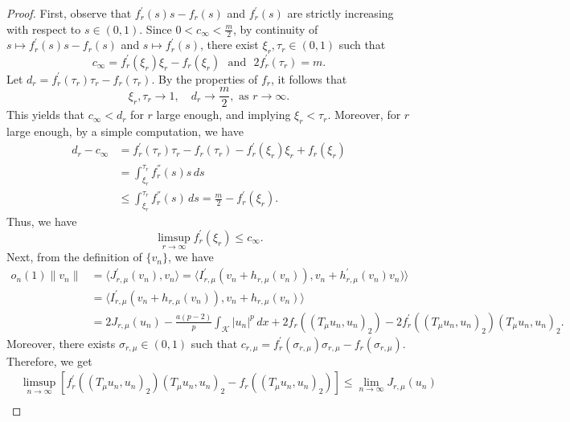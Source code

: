 \documentclass[11pt]{amsart}
\newcommand{\abs}[1]{\lvert#1\rvert}
\newcommand{\norm}[1]{\lVert#1\rVert}
\newcommand{\K}{\mathcal{K}}
\numberwithin{equation}{section}
\begin{document}
\begin{proof}
 First, observe that $f_{r}^{\prime}(s)s-f_{r}(s)$ and $f_{r}^{\prime}(s)$ are strictly increasing with respect to $s \in (0,1)$. Since $0<c_\infty < \frac{m}{2}$, by continuity of $s \mapsto f_{r}^{\prime}(s) s-f_{r}(s)$ and $s \mapsto f_{r}^{\prime}(s)$, there exist $\xi_{r}, \tau_{r} \in (0,1)$ such that
$$
c_{\infty}=f_{r}^{\prime}(\xi_{r})\xi_{r}-f_{r}(\xi_{r})\,\, \text{ and }\,\, 2f_{r}^{\prime}(\tau_{r})=m.
$$
Let $d_{r}=f_{r}^{\prime}(\tau_{r}) \tau_{r}-f_{r}(\tau_{r})$. By the properties of $f_{r}$, it follows that
$$
\xi_{r}, \tau_{r} \to 1, \quad d_{r} \to \frac{m}{2},\,\,\text{as}\,\,r \to \infty.
$$
This yields that $c_{\infty}<d_{r}$ for $r$ large enough, and implying $\xi_{r}<\tau_{r}$. Moreover, for $r$ large enough, by a simple computation, we have
$$
\begin{aligned}
d_{r}-c_{\infty} & =f_{r}^{\prime}(\tau_{r}) \tau_{r}-f_{r}(\tau_{r})-f_{r}^{\prime}(\xi_{r}) \xi_{r}+f_{r}(\xi_{r}) \\
& =\int_{\xi_{r}}^{\tau_{r}} f_{r}^{''}(s) s \,ds \\
& \leq \int_{\xi_{r}}^{\tau_{r}} f_{r}^{''}(s) \,ds=\frac{m}{2}-f_{r}^{\prime}(\xi_{r}).
\end{aligned}
$$
Thus, we have
\begin{equation}\label{eqsupfr}
\limsup_{r \to \infty} f_{r}^{\prime}(\xi_{r}) \leq c_{\infty}.
\end{equation}
Next, from the definition of $\{v_{n}\}$, we have
$$
\begin{aligned}
 o_{n}(1)\norm{v_{n}} &= \langle J_{r, \mu}^{\prime}(v_{n}), v_{n}\rangle=\langle I_{r, \mu}^{\prime}(v_{n}+h_{r, \mu}(v_{n})),v_{n}+h_{r, \mu}^{\prime}(v_{n}) v_{n})\rangle \\
& =\langle I_{r, \mu}^{\prime}(v_{n}+h_{r, \mu}(v_{n})),v_{n}+h_{r, \mu}(v_{n})\rangle \\
& =2 J_{r, \mu}(u_{n})-\frac{a(p-2)}{p} \int_{\K}\abs{u_{n}}^{p}\,dx+2 f_{r}((T_{\mu} u_{n}, u_{n})_{2})-2f_{r}^{\prime}((T_{\mu} u_{n}, u_{n})_{2})(T_{\mu} u_{n}, u_{n})_{2}.
\end{aligned}
$$
Moreover, there exists $\sigma_{r, \mu} \in(0,1)$ such that $c_{r, \mu}=f_{r}^{\prime}(\sigma_{r, \mu}) \sigma_{r, \mu}-f_{r}(\sigma_{r, \mu}).$ Therefore, we get
$$
\begin{aligned}
& \limsup_{n \to \infty}\left[f_{r}^{\prime}((T_{\mu} u_{n}, u_{n})_{2})(T_{\mu} u_{n}, u_{n})_{2}-f_{r}((T_{\mu} u_{n}, u_{n})_{2})\right] \leq \lim_{n \to \infty} J_{r, \mu}(u_{n}) \\

\end{aligned}$$
\end{proof}
\end{document}
